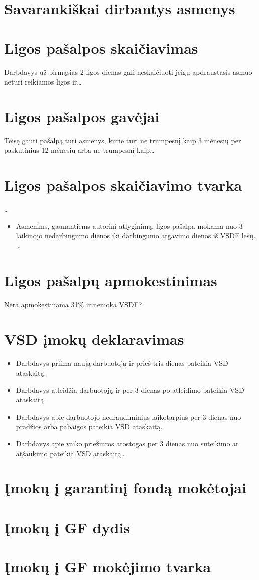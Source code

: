 \section{Savarankiškai dirbantys asmenys}

\section{Ligos pašalpos skaičiavimas}

Darbdavys už pirmąsias 2 ligos dienas gali neskaičiuoti jeigu
apdraustasis asmuo neturi reikiamos ligos ir…

\section{Ligos pašalpos gavėjai}

Teisę gauti pašalpą turi asmenys, kurie turi ne trumpesnį kaip
3 mėnesių per paskutinius 12 mėnesių arba ne trumpesnį kaip…

\section{Ligos pašalpos skaičiavimo tvarka}

…

\begin{itemize}
  \item Asmenims, gaunantiems autorinį atlyginimą, ligos pašalpa mokama
    nuo 3 laikinojo nedarbingumo dienos iki darbingumo atgavimo dienos
    iš VSDF lėšų.
    …
\end{itemize}

\section{Ligos pašalpų apmokestinimas}

Nėra apmokestinama 31\% ir nemoka VSDF?

\section{VSD įmokų deklaravimas}

\begin{itemize}
  \item Darbdavys priima naują darbuotoją ir prieš tris dienas pateikia
    VSD ataskaitą.
  \item Darbdavys atleidžia darbuotoją ir per 3 dienas po atleidimo
    pateikia VSD ataskaitą.
  \item Darbdavys apie darbuotojo nedraudiminius laikotarpius per 3 dienas
    nuo pradžios arba pabaigos pateikia VSD ataskaitą.
  \item Darbdavys apie vaiko priežiūros atostogas per 3 dienas nuo
    suteikimo ar atšaukimo pateikia VSD ataskaitą…
\end{itemize}

\section{Įmokų į garantinį fondą mokėtojai}

\section{Įmokų į GF dydis}

\section{Įmokų į GF mokėjimo tvarka}


